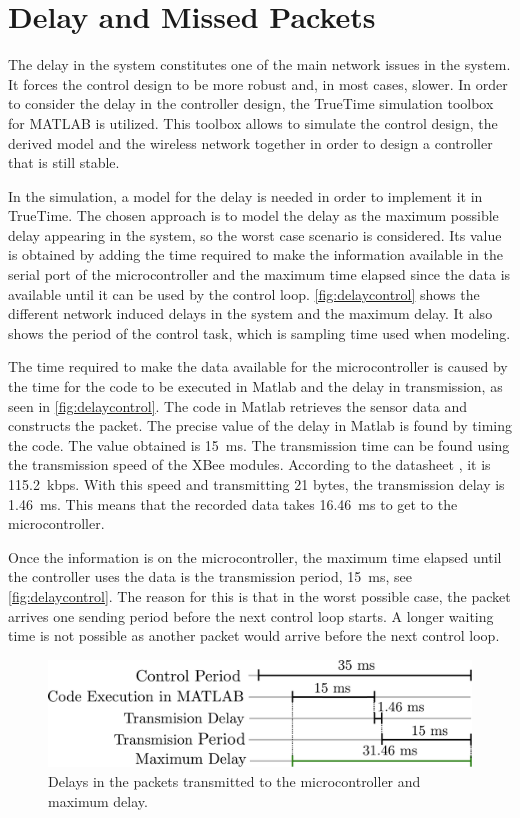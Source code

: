 \section{Delay and Missed Packets}
The delay in the system constitutes one of the main network issues in the system. It forces the control design to be more robust and, in most cases, slower. In order to consider the delay in the controller design, the TrueTime simulation toolbox for MATLAB is utilized. This toolbox allows to simulate the control design, the derived model and the wireless network together in order to design a controller that is still stable.

In the simulation, a model for the delay is needed in order to implement it in TrueTime. The chosen approach is to model the delay as the maximum possible delay appearing in the system, so the worst case scenario is considered. Its value is obtained by adding the time required to make the information available in the serial port of the microcontroller and the maximum time elapsed since the data is available until it can be used by the control loop. \autoref{fig:delaycontrol} shows the different network induced delays in the system and the maximum delay. It also shows the period of the control task, which is sampling time used when modeling.

The time required to make the data available for the microcontroller is caused by the time for the code to be executed in Matlab and the delay in transmission, as seen in \autoref{fig:delaycontrol}. The code in Matlab retrieves the sensor data and constructs the packet. The precise value of the delay in Matlab is found by timing the code. The value obtained is \SI{15}{ms}. The transmission time can be found using the transmission speed of the XBee modules. According to the datasheet \cite{XBee}, it is \SI{115.2}{kbps}. With this speed and transmitting 21 bytes, the transmission delay is \SI{1.46}{ms}. This means that the recorded data takes \SI{16.46}{ms} to get to the microcontroller.

Once the information is on the microcontroller, the maximum time elapsed until the controller uses the data is the transmission period, \SI{15}{ms}, see \autoref{fig:delaycontrol}. The reason for this is that in the worst possible case, the packet arrives one sending period before the next control loop starts. A longer waiting time is not possible as another packet would arrive before the next control loop.
 
\begin{figure}[H]
	\centering
	\includegraphics[width=.6\textwidth]{figures/maxDelay.pdf}
	\caption{Delays in the packets transmitted to the microcontroller and maximum delay.}
	\label{fig:delaycontrol}
\end{figure}

